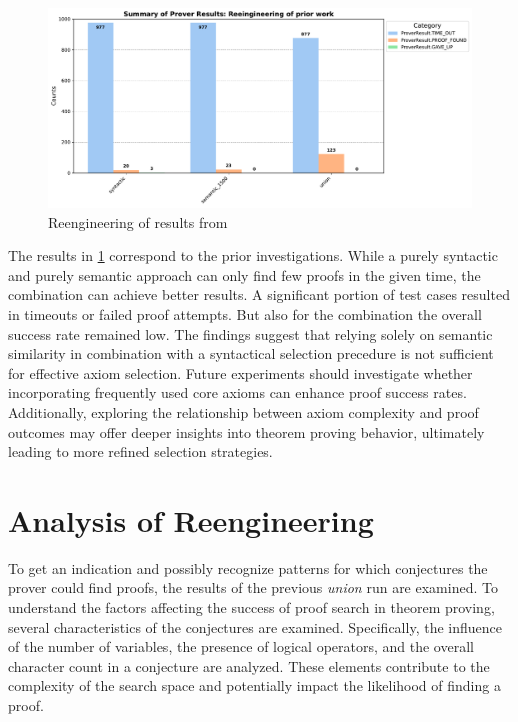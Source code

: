 \documentclass[english,version-2020-11]{uzl-thesis}
\begin{document}
\begin{figure}[ht]
    \centering
    \includegraphics[width=\textwidth]{standard_mode_noAdded_output.pdf}
    \caption{Reengineering of results from \cite{Schon2024}}
    \label{fig:reengineering}
\end{figure}

The results in \ref{fig:reengineering} correspond to the prior investigations. While a purely syntactic and purely semantic approach can only find few proofs in the given time, the combination can achieve better results.
A significant portion of test cases resulted in timeouts or failed proof attempts. But also for the combination the overall success rate remained low.
The findings suggest that relying solely on semantic similarity in combination with a syntactical selection precedure is not sufficient for effective axiom selection. Future experiments should investigate whether incorporating frequently used core axioms can enhance proof success rates. Additionally, exploring the relationship between axiom complexity and proof outcomes may offer deeper insights into theorem proving behavior, ultimately leading to more refined selection strategies.


\section{Analysis of Reengineering}

To get an indication and possibly recognize patterns for which conjectures the prover could find proofs, the results of the previous \textit{union} run are examined. To understand the factors affecting the success of proof search in theorem proving, several characteristics of the conjectures are examined. Specifically, the influence of the number of variables, the presence of logical operators, and the overall character count in a conjecture are analyzed. These elements contribute to the complexity of the search space and potentially impact the likelihood of finding a proof.
\end{document}
